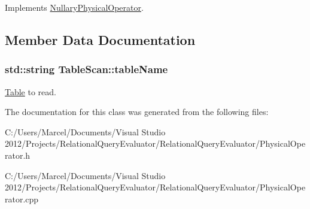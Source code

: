 Implements \hyperlink{class_nullary_physical_operator_a053a51bc73b06d883fba982adeeb122c}{Nullary\+Physical\+Operator}.



\subsection{Member Data Documentation}
\hypertarget{class_table_scan_a8ac51489c963d33273bfa178a5c033c1}{
\subsubsection[{table\+Name}]{\setlength{\rightskip}{0pt plus 5cm}std\+::string Table\+Scan\+::table\+Name}}\label{class_table_scan_a8ac51489c963d33273bfa178a5c033c1}
\hyperlink{class_table}{Table} to read. 

The documentation for this class was generated from the following files\+:\begin{DoxyCompactItemize}
\item 
C\+:/\+Users/\+Marcel/\+Documents/\+Visual Studio 2012/\+Projects/\+Relational\+Query\+Evaluator/\+Relational\+Query\+Evaluator/Physical\+Operator.\+h\item 
C\+:/\+Users/\+Marcel/\+Documents/\+Visual Studio 2012/\+Projects/\+Relational\+Query\+Evaluator/\+Relational\+Query\+Evaluator/Physical\+Operator.\+cpp\end{DoxyCompactItemize}
